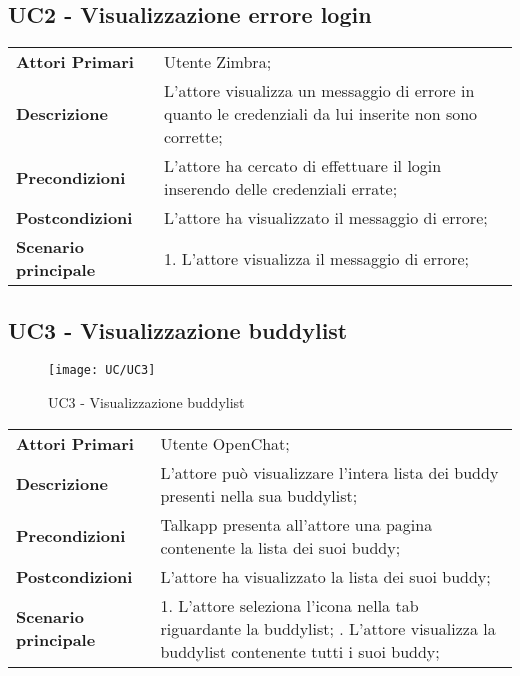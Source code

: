 
\subsection{UC2 - Visualizzazione errore login}
\begin{center}
	\bgroup
	\def\arraystretch{1.8}     
	\begin{longtable}{  p{4cm} | p{9.5cm} } 
		\textbf{Attori Primari} & Utente Zimbra; \\ 
		\textbf{Descrizione} &  L'attore visualizza un messaggio di errore in quanto le credenziali da lui inserite non sono corrette; \\ 
		\textbf{Precondizioni}  & L'attore ha cercato di effettuare il login inserendo delle credenziali errate; \\
		\textbf{Postcondizioni} & L'attore ha visualizzato il messaggio di errore;  \\ 
		\textbf{Scenario principale} & 
		1. L'attore visualizza il messaggio di errore;
	\end{longtable}
	\egroup
\end{center}


\subsection{UC3 - Visualizzazione buddylist}
\begin{figure}[H] 
	\centering
	\texttt{[image: UC/UC3]}
	\caption{UC3 - Visualizzazione buddylist}
\end{figure}
\begin{center}
	\bgroup
	\def\arraystretch{1.8}     
	\begin{longtable}{  p{4cm} | p{9.5cm} } 
		\textbf{Attori Primari} & Utente OpenChat; \\ 
		\textbf{Descrizione} &  L'attore può visualizzare l'intera lista dei buddy presenti nella sua buddylist; \\ 
		\textbf{Precondizioni}  & Talkapp presenta all'attore una pagina contenente la lista dei suoi buddy; \\
		\textbf{Postcondizioni} & L'attore ha visualizzato la lista dei suoi buddy;  \\ 
		\textbf{Scenario principale} & 
		1. L'attore seleziona l'icona nella tab riguardante la buddylist; \newline
		2. L'attore visualizza la buddylist contenente tutti i suoi buddy;
	\end{longtable}
	\egroup
\end{center}

